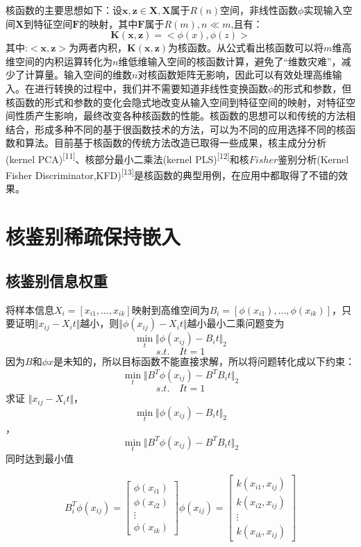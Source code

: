 \documentclass[bachelor,zhspacing]{cqu}  %
\begin{document}
核函数的主要思想如下：设\(\mathbf{x},\mathbf{z}\in\mathbf{X},\mathbf{X}\)属于\(R(n)\)空间，非线性函数\(\phi\)实现输入空间\(\mathbf{X}\)到特征空间\(\mathbf{F}\)的映射，其中\(\mathbf{F}\)属于\(R(m),n\ll m\),且有：
\[\mathbf{K}(\mathbf{x},\mathbf{z}) = <\phi (x),\phi (z)>\]
其中:\(<\mathbf{x},\mathbf{z}>\)为两者内积，\(\mathbf{K}(\mathbf{x},\mathbf{z})\)为核函数。从公式看出核函数可以将\(m\)维高维空间的内积运算转化为\(n\)维低维输入空间的核函数计算，避免了``维数灾难''，减少了计算量。输入空间的维数\(n\)对核函数矩阵无影响，因此可以有效处理高维输入。在进行转换的过程中，我们并不需要知道非线性变换函数\(\phi\)的形式和参数，但核函数的形式和参数的变化会隐式地改变从输入空间到特征空间的映射，对特征空间性质产生影响，最终改变各种核函数的性能。核函数的思想可以和传统的方法相结合，形成多种不同的基于很函数技术的方法，可以为不同的应用选择不同的核函数和算法。目前基于核函数的传统方法改造已取得一些成果，核主成分分析(kernel
PCA)\textsuperscript{{[}11{]}}、核部分最小二乘法(kernel
PLS)\textsuperscript{{[}12{]}}和核\(Fisher\)鉴别分析(Kernel Fisher
Discriminator,KFD)\textsuperscript{{[}13{]}}是核函数的典型用例，在应用中都取得了不错的效果。

\section{核鉴别稀疏保持嵌入}\label{ux6838ux9274ux522bux7a00ux758fux4fddux6301ux5d4cux5165}

\subsection{核鉴别信息权重}\label{ux6838ux9274ux522bux4fe1ux606fux6743ux91cd}

将样本信息\(X_{i}=[x_{i1},\ldots,x_{ik}]\)映射到高维空间为\(B_{i}=[\phi(x_{i1}),\ldots,\phi(x_{ik})]\)，只要证明\(\Vert x_{ij}-X_{i}t\Vert\)越小，则\(\Vert \phi(x_{ij})-X_{i}t\Vert\)越小最小二乘问题变为
\[\min_{t}\Vert{\phi{(x_{ij})}-B_{i}t}\Vert_{2}\] \[s.t.\quad It=1\]
因为\(B\)和\(\phi{x}\)是未知的，所以目标函数不能直接求解，所以将问题转化成以下约束：
\[\min_{t}\Vert{B^{T}\phi{(x_{ij})}-B^{T}B_{i}t}\Vert_{2}\]
\[s.t.\quad It=1\] 求证
\(\Vert x_{ij}-X_{i}t\Vert\)，\[\min_{t}\Vert{\phi{(x_{ij})}-B_{i}t}\Vert_{2}\]，\[\min_{t}\Vert{B^{T}\phi{(x_{ij})}-B^{T}B_{i}t}\Vert_{2}\]同时达到最小值

\[B_{i}^{T}\phi{(x_{ij})}=
        \left[
            \begin{array}{ccc}
                \phi{(x_{i1})}\\
                \phi{(x_{i2})}\\
                \vdots\\
                \phi{(x_{ik})}
            \end{array}
        \right]\phi{(x_{ij})}=
        \left[
            \begin{array}{ccc}
                k(x_{i1},x_{ij})\\
                k(x_{i2},x_{ij})\\
                \vdots\\
                k(x_{ik},x_{ij})
            \end{array}
        \right]\]
\end{document}

